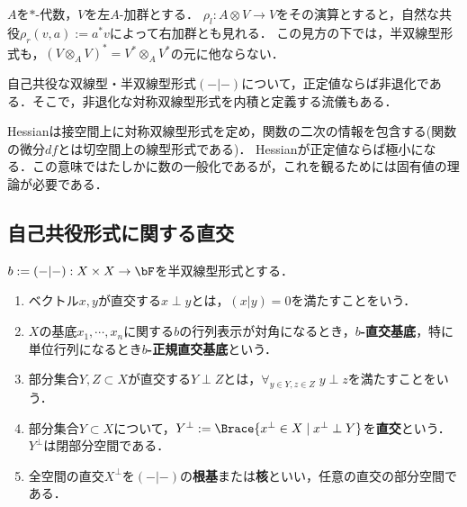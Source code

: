 \documentclass[uplatex, dvipdfmx]{jsreport}
\begin{document}
\begin{definition}\label{def-sesquilinear-form}
    $A$を$*$-代数，$V$を左$A$-加群とする．
    $\rho_l:A\otimes V\to V$をその演算とすると，自然な共役$\rho_r(v,a):=a^*v$によって右加群とも見れる．
    この見方の下では，半双線型形式も，$(V\otimes_AV)^*=V^*\otimes_AV^*$の元に他ならない．
\end{definition}
\begin{remarks}[正定値ならば非退化]
    自己共役な双線型・半双線型形式$(-|-)$について，正定値ならば非退化である．そこで，非退化な対称双線型形式を内積と定義する流儀もある．
\end{remarks}
\begin{example}[ヘッシアン]
    Hessianは接空間上に対称双線型形式を定め，関数の二次の情報を包含する(関数の微分$df$とは切空間上の線型形式である)．
    Hessianが正定値ならば極小になる．この意味ではたしかに数の一般化であるが，これを観るためには固有値の理論が必要である．
\end{example}

\subsection{自己共役形式に関する直交}

\begin{definition}[orthogonal]
    $b:=(-|-):X\times X\to\bF$を半双線型形式とする．
    \begin{enumerate}
        \item ベクトル$x,y$が直交する$x\perp y$とは，$(x|y)=0$を満たすことをいう．
        \item $X$の基底$x_1,\cdots,x_n$に関する$b$の行列表示が対角になるとき，\textbf{$b$-直交基底}，特に単位行列になるとき\textbf{$b$-正規直交基底}という．
        \item 部分集合$Y,Z\subset X$が直交する$Y\perp Z$とは，$\forall_{y\in Y,z\in Z}\;y\perp z$を満たすことをいう．
        \item 部分集合$Y\subset X$について，$Y^\perp:=\Brace{x^\perp\in X\mid x^\perp\perp Y}$を\textbf{直交}という．$Y^\perp$は閉部分空間である．
        \item 全空間の直交$X^\perp$を$(-|-)$の\textbf{根基}または\textbf{核}といい，任意の直交の部分空間である．
    \end{enumerate}
\end{definition}
\end{document}
